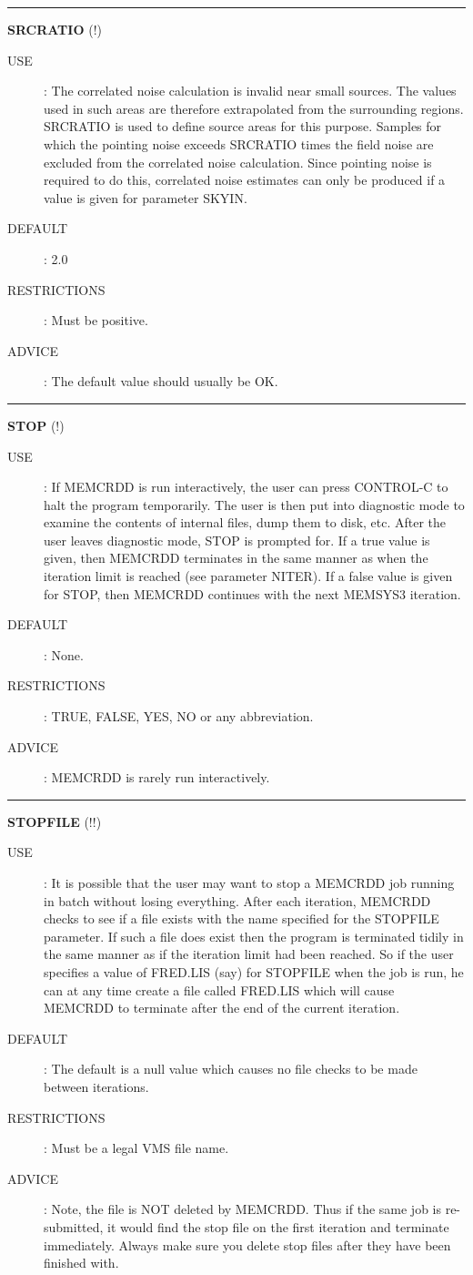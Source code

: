 \rule{\textwidth}{0.3mm}
{\Large {\bf SRCRATIO} (!)}
\begin{description}
\item [USE]:
The correlated noise calculation is invalid near small sources. The values used
in such areas are therefore extrapolated from the surrounding regions. SRCRATIO
is used to define source areas for this purpose. Samples for which the
pointing noise exceeds SRCRATIO times the field noise are excluded from the
correlated noise calculation. Since pointing noise is required to do this,
correlated noise estimates can only be produced if a value is given for
parameter SKYIN.
\item [DEFAULT]:
2.0
\item [RESTRICTIONS]:
Must be positive.
\item [ADVICE]:
The default value should usually be OK.
\end {description}

\rule{\textwidth}{0.3mm}
{\Large {\bf STOP } (!)}
\begin{description}
\item [USE]:
If MEMCRDD is run interactively, the user can press CONTROL-C to halt the
program temporarily. The user is then put into diagnostic mode to examine the
contents of internal files, dump them to disk, etc. After the user leaves
diagnostic mode, STOP is prompted for. If a true value is given, then MEMCRDD
terminates in the same manner as when the iteration limit is reached (see
parameter NITER). If a false value is given for STOP, then MEMCRDD continues
with the next MEMSYS3 iteration.
\item [DEFAULT]:
None.
\item [RESTRICTIONS]:
TRUE, FALSE, YES, NO or any abbreviation.
\item [ADVICE]:
MEMCRDD is rarely run interactively.
\end {description}

\rule{\textwidth}{0.3mm}
{\Large {\bf STOPFILE} (!!)}
\begin{description}
\item [USE]:
It is possible that the user may want to stop a MEMCRDD job running in batch
without losing everything. After each iteration, MEMCRDD checks to see if a file
exists with the name specified for the STOPFILE parameter. If such a file does
exist then the program is terminated tidily in the same manner as if the
iteration limit had been reached. So if the user specifies a value of FRED.LIS
(say) for STOPFILE when the job is run, he can at any time create a file called
FRED.LIS which will cause MEMCRDD to terminate after the end of the current
iteration.
\item [DEFAULT]:
The default is a null value which causes no file checks to be made between
iterations.
\item [RESTRICTIONS]:
Must be a legal VMS file name.
\item [ADVICE]:
Note, the file is NOT deleted by MEMCRDD. Thus if the same job is re-submitted,
it would find the stop file on the first iteration and terminate immediately.
Always make sure you delete stop files after they have been finished with.
\end {description}

